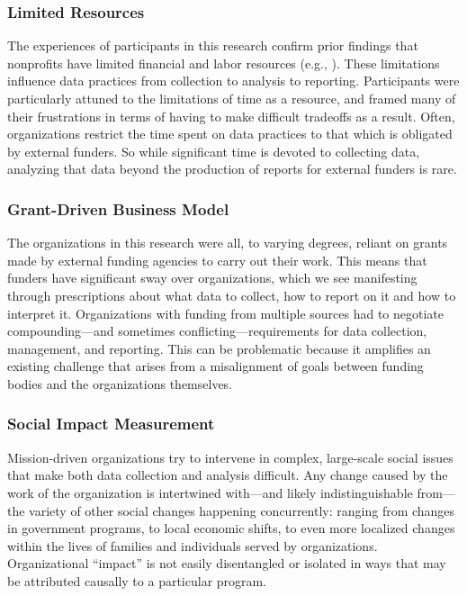 \subsubsection{Limited Resources}
The experiences of participants in this research confirm prior findings that nonprofits have limited financial and labor resources (e.g., \cite{Merkel2007Learning,Voida2011Homebrew}). These limitations influence data practices from collection to analysis to reporting. Participants were particularly attuned to the limitations of time as a resource, and framed many of their frustrations in terms of having to make difficult tradeoffs as a result. Often, organizations restrict the time spent on data practices to that which is obligated by external funders. So while significant time is devoted to collecting data, analyzing that data beyond the production of reports for external funders is rare.

\subsubsection{Grant-Driven Business Model}
The organizations in this research were all, to varying degrees, reliant on grants made by external funding agencies to carry out their work. This means that funders have significant sway over organizations, which we see manifesting through prescriptions about what data to collect, how to report on it and how to interpret it. Organizations with funding from multiple sources had to negotiate compounding—and sometimes conflicting—requirements for data collection, management, and reporting. This can be problematic because it amplifies an existing challenge that arises from a misalignment of goals between funding bodies and the organizations themselves.

\subsubsection{Social Impact Measurement}
Mission-driven organizations try to intervene in complex, large-scale social issues that make both data collection and analysis difficult. Any change caused by the work of the organization is intertwined with—and likely indistinguishable from—the variety of other social changes happening concurrently: ranging from changes in government programs, to local economic shifts, to even more localized changes within the lives of families and individuals served by organizations. Organizational “impact” is not easily disentangled or isolated in ways that may be attributed causally to a particular program. 

